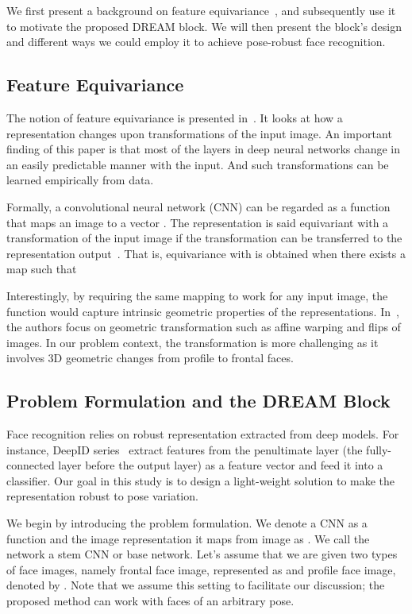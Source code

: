 \documentclass[10pt,twocolumn,letterpaper]{article}
\begin{document}
We first present a background on feature equivariance~\cite{lenc2015understanding}, and subsequently use it to motivate the proposed DREAM block. We will then present the block's design and different ways we could employ it to achieve pose-robust face recognition. 

\subsection{Feature Equivariance}
\label{subsec:equivariance}


The notion of feature equivariance is presented in~\cite{lenc2015understanding}.
It looks at how a representation changes upon transformations of the input image. An important finding of this paper is that most of the layers in deep neural networks change in an easily predictable manner with the input. And such transformations can be learned empirically from data.

Formally, a convolutional neural network (CNN) can be regarded as a function  that maps an image  to a vector . The representation  is said equivariant with a transformation  of the input image if the transformation can be transferred to the representation output~\cite{lenc2015understanding}. That is, equivariance with  is obtained when there exists a map  such that 

Interestingly, by requiring the same mapping  to work for any input image, the function would capture intrinsic geometric properties of the representations.
In~\cite{lenc2015understanding}, the authors focus on geometric transformation such as affine warping and flips of images.
In our problem context, the transformation  is more challenging as it involves 3D geometric changes from profile to frontal faces.

\subsection{Problem Formulation and the DREAM Block}
\label{subsec:formulation}


Face recognition relies on robust representation extracted from deep models. For instance, DeepID series~\cite{sun2014deep} extract features from the penultimate layer (the fully-connected layer before the output layer) as a feature vector and feed it into a classifier. Our goal in this study is to design a light-weight solution to make the representation robust to pose variation.   

We begin by introducing the problem formulation. 
We denote a CNN as a function  and the image representation it maps from image  as . We call the network a stem CNN or base network.
Let's assume that we are given two types of face images, namely frontal face image, represented as  and profile face image, denoted by . Note that we assume this setting to facilitate our discussion; the proposed method can work with faces of an arbitrary pose.
\end{document}
